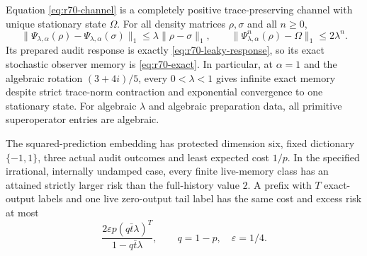 \begin{theorem}\label{thm:r70-physical}
Equation \eqref{eq:r70-channel} is a completely positive trace-preserving channel with unique stationary state $\Omega$. For all density matrices $\rho,\sigma$ and all $n\ge0$,
\[
 \|\Psi_{\lambda,\alpha}(\rho)-\Psi_{\lambda,\alpha}(\sigma)\|_1
 \le\lambda\|\rho-\sigma\|_1,
 \qquad
 \|\Psi_{\lambda,\alpha}^n(\rho)-\Omega\|_1\le2\lambda^n.
\]
Its prepared audit response is exactly \eqref{eq:r70-leaky-response}, so its exact stochastic observer memory is \eqref{eq:r70-exact}. In particular, at $\alpha=1$ and the algebraic rotation $(3+4i)/5$, every $0<\lambda<1$ gives infinite exact memory despite strict trace-norm contraction and exponential convergence to one stationary state. For algebraic $\lambda$ and algebraic preparation data, all primitive superoperator entries are algebraic.

The squared-prediction embedding has protected dimension six, fixed dictionary $\{-1,1\}$, three actual audit outcomes and least expected cost $1/p$. In the specified irrational, internally undamped case, every finite live-memory class has an attained strictly larger risk than the full-history value $2$. A prefix with $T$ exact-output labels and one live zero-output tail label has the same cost and excess risk at most
\begin{equation}\label{eq:r70-approx}
 \frac{2\varepsilon p(q\bar t\lambda)^T}{1-q\bar t\lambda},
 \qquad q=1-p,\quad\varepsilon=1/4.
\end{equation}
\end{theorem}
